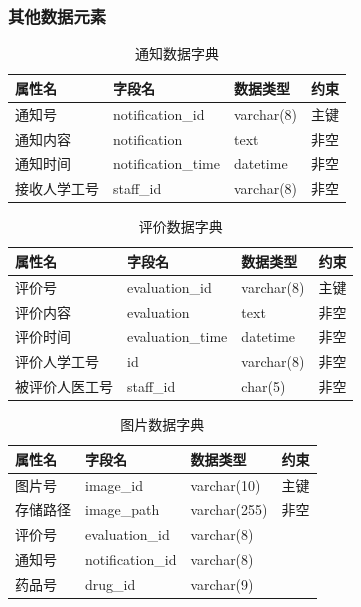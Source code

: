\documentclass{article}
\begin{document}
\subsubsection{其他数据元素}

\begin{table}[H]
    \centering
    \begin{tabularx}{\textwidth}{|p{2.2cm}|p{3.2cm}|p{4.8cm}|p{5cm}|}
    \toprule
    \textbf{属性名} & \textbf{字段名} & \textbf{数据类型} & \textbf{约束} \\ \midrule
    通知号 & notification\_id & varchar(8) & 主键 \\ \midrule
    通知内容 & notification & text & 非空 \\ \midrule
    通知时间 & notification\_time & datetime & 非空 \\ \midrule
    接收人学工号 & staff\_id & varchar(8) & 非空 \\ \bottomrule
    \end{tabularx}
    \caption{通知数据字典}
    \label{tab:notification}   
\end{table}

\begin{table}[H]
    \centering
    \begin{tabularx}{\textwidth}{|p{2.2cm}|p{3.2cm}|p{4.8cm}|p{5cm}|}
    \toprule
    \textbf{属性名} & \textbf{字段名} & \textbf{数据类型} & \textbf{约束} \\ \midrule
    评价号 & evaluation\_id & varchar(8) & 主键 \\ \midrule
    评价内容 & evaluation & text & 非空 \\ \midrule
    评价时间 & evaluation\_time & datetime & 非空 \\ \midrule
    评价人学工号 & id & varchar(8) & 非空 \\ \midrule
    被评价人医工号 & staff\_id & char(5) & 非空 \\ \bottomrule
    \end{tabularx}
    \caption{评价数据字典}
    \label{tab:evaluation}
\end{table}

\begin{table}[H]
    \centering
    \begin{tabularx}{\textwidth}{|p{2.2cm}|p{3.2cm}|p{4.8cm}|p{5cm}|}
    \toprule
    \textbf{属性名} & \textbf{字段名} & \textbf{数据类型} & \textbf{约束} \\ \midrule
    图片号 & image\_id & varchar(10) & 主键 \\ \midrule
    存储路径 & image\_path & varchar(255) & 非空 \\ \midrule
    评价号 & evaluation\_id & varchar(8) &  \\ \midrule
    通知号 & notification\_id & varchar(8) &  \\ \midrule
    药品号 & drug\_id & varchar(9) &  \\ \bottomrule
    \end{tabularx}
    \caption{图片数据字典}
    \label{tab:image}
\end{table}
\end{document}
